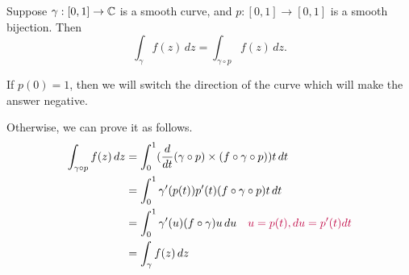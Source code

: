 \documentclass{homework}
\begin{document}
                                                                                                      \begin{problem}%
                                                                                                        Suppose $\gamma : [0,1] \to \mathbb{C}$ is a smooth curve, and $p : [0,1] \to [0,1]$ is a smooth bijection.
                                                                                                          Then
                                                                                                            \[
                                                                                                                \int_\gamma f(z) \, dz = \int_{\gamma \circ p} f(z) \, dz.
                                                                                                                  \]
                                                                                                                  \end{problem}
                                                                                                                  \begin{solution}
                                                                                                                  If $p(0)=1$, then we will switch the direction of the curve which will make the answer negative. 

                                                                                                                  Otherwise, we can prove it as follows.
                                                                                                                  \begin{align*}
                                                                                                                  \int_{\gamma \circ p} f(z) \, dz &= \int_0^1 (\frac{d}{dt}(\gamma\circ p) \times (f \circ \gamma \circ p))t \,dt\\
                                                                                                                  &= \int_{0}^1 \gamma'(p(t))p'(t) (f \circ \gamma \circ p)t\, dt \\
                                                                                                                  &= \int_{0}^1 \gamma'(u) (f \circ \gamma)u\, du \quad \color{purple} u=p(t), du = p'(t)dt\\
                                                                                                                  &= \int_{\gamma} f(z) \, dz
                                                                                                                  \end{align*}
                                                                                                                  \end{solution}
\end{document}
